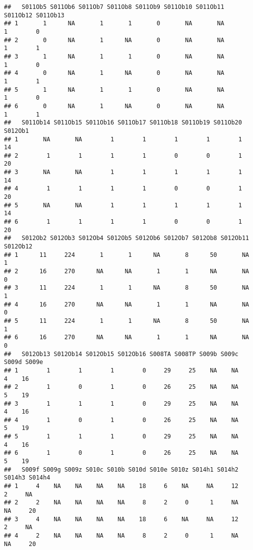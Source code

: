 \documentclass[
]{article}
\begin{document}
\begin{verbatim}
##   S011Ob5 S011Ob6 S011Ob7 S011Ob8 S011Ob9 S011Ob10 S011Ob11 S011Ob12 S011Ob13
## 1       1      NA       1       1       0       NA       NA        1        0
## 2       0      NA       1      NA       0       NA       NA        1        1
## 3       1      NA       1       1       0       NA       NA        1        0
## 4       0      NA       1      NA       0       NA       NA        1        1
## 5       1      NA       1       1       0       NA       NA        1        0
## 6       0      NA       1      NA       0       NA       NA        1        1
##   S011Ob14 S011Ob15 S011Ob16 S011Ob17 S011Ob18 S011Ob19 S011Ob20 S012Ob1
## 1       NA       NA        1        1        1        1        1      14
## 2        1        1        1        1        0        0        1      20
## 3       NA       NA        1        1        1        1        1      14
## 4        1        1        1        1        0        0        1      20
## 5       NA       NA        1        1        1        1        1      14
## 6        1        1        1        1        0        0        1      20
##   S012Ob2 S012Ob3 S012Ob4 S012Ob5 S012Ob6 S012Ob7 S012Ob8 S012Ob11 S012Ob12
## 1      11     224       1       1      NA       8      50       NA        1
## 2      16     270      NA      NA       1       1      NA       NA        0
## 3      11     224       1       1      NA       8      50       NA        1
## 4      16     270      NA      NA       1       1      NA       NA        0
## 5      11     224       1       1      NA       8      50       NA        1
## 6      16     270      NA      NA       1       1      NA       NA        0
##   S012Ob13 S012Ob14 S012Ob15 S012Ob16 S008TA S008TP S009b S009c S009d S009e
## 1        1        1        1        0     29     25    NA    NA     4    16
## 2        1        0        1        0     26     25    NA    NA     5    19
## 3        1        1        1        0     29     25    NA    NA     4    16
## 4        1        0        1        0     26     25    NA    NA     5    19
## 5        1        1        1        0     29     25    NA    NA     4    16
## 6        1        0        1        0     26     25    NA    NA     5    19
##   S009f S009g S009z S010c S010b S010d S010e S010z S014h1 S014h2 S014h3 S014h4
## 1     4    NA    NA    NA    NA    18     6    NA     NA     12      2     NA
## 2     2    NA    NA    NA    NA     8     2     0      1     NA     NA     20
## 3     4    NA    NA    NA    NA    18     6    NA     NA     12      2     NA
## 4     2    NA    NA    NA    NA     8     2     0      1     NA     NA     20

\end{verbatim}
\end{document}
